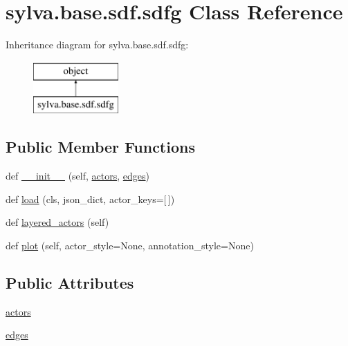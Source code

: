 \hypertarget{classsylva_1_1base_1_1sdf_1_1sdfg}{}\section{sylva.\+base.\+sdf.\+sdfg Class Reference}
\label{classsylva_1_1base_1_1sdf_1_1sdfg}
Inheritance diagram for sylva.\+base.\+sdf.\+sdfg\+:\begin{figure}[H]
\begin{center}
\leavevmode
\includegraphics[height=2.000000cm]{classsylva_1_1base_1_1sdf_1_1sdfg}
\end{center}
\end{figure}
\subsection*{Public Member Functions}
\begin{DoxyCompactItemize}
\item 
def \hyperlink{classsylva_1_1base_1_1sdf_1_1sdfg_ada06f4f9209867a6aed563cb4c8a62e4}{\+\_\+\+\_\+init\+\_\+\+\_\+} (self, \hyperlink{classsylva_1_1base_1_1sdf_1_1sdfg_af732b01ce693d1d4b9fc0ebd99c3fdad}{actors}, \hyperlink{classsylva_1_1base_1_1sdf_1_1sdfg_a1c2b2c217ea9a12397686313ae4146d5}{edges})
\item 
def \hyperlink{classsylva_1_1base_1_1sdf_1_1sdfg_abdac55d55690dc28e8cbd5dcaf05493c}{load} (cls, json\+\_\+dict, actor\+\_\+keys=\mbox{[}$\,$\mbox{]})
\item 
def \hyperlink{classsylva_1_1base_1_1sdf_1_1sdfg_a56860c252c6363ef47c67a15d979f59f}{layered\+\_\+actors} (self)
\item 
def \hyperlink{classsylva_1_1base_1_1sdf_1_1sdfg_a0ec53888667270ea6aec60425b2c8742}{plot} (self, actor\+\_\+style=None, annotation\+\_\+style=None)
\end{DoxyCompactItemize}
\subsection*{Public Attributes}
\begin{DoxyCompactItemize}
\item 
\hyperlink{classsylva_1_1base_1_1sdf_1_1sdfg_af732b01ce693d1d4b9fc0ebd99c3fdad}{actors}
\item 
\hyperlink{classsylva_1_1base_1_1sdf_1_1sdfg_a1c2b2c217ea9a12397686313ae4146d5}{edges}
\end{DoxyCompactItemize}


